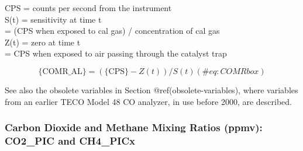 \documentclass[
  english,
]{book}
\begin{document}
CPS = counts per second from the
instrument\\
S(t) = sensitivity
at time t\\
\hspace*{0.333em}\hspace*{0.333em}\hspace*{0.333em}\hspace*{0.333em}\hspace*{0.333em}\hspace*{0.333em}\hspace*{0.333em}=
(CPS when exposed to cal gas) / concentration of cal gas\\
Z(t) = zero at time t\\
\hspace*{0.333em}\hspace*{0.333em}\hspace*{0.333em}\hspace*{0.333em}\hspace*{0.333em}\hspace*{0.333em}\hspace*{0.333em}=
CPS when exposed to air passing through the catalyst trap

\begin{equation}
\mathrm{\{COMR\_AL\}} = (\mathrm{\{CPS\}}-Z(t))/S(t)
(\#eq:COMRbox)
\end{equation}

See also the obsolete variables in Section @ref(obsolete-variables),
where variables from an earlier TECO Model 48 CO analyzer, in use before
2000, are described.

\hypertarget{co2-pic}{%
\subsubsection*{Carbon Dioxide and Methane Mixing Ratios (ppmv):
CO2\_PIC and CH4\_PICx}\label{co2-pic}}
\end{document}
